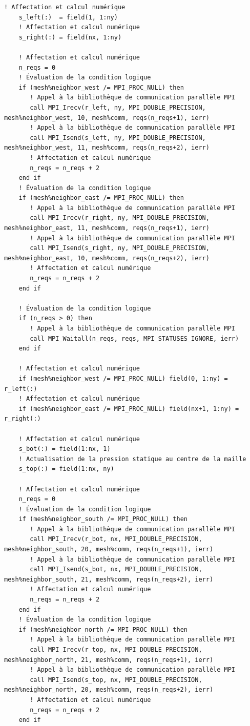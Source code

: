 \documentclass[10pt,a4paper,oneside]{book}
\begin{document}
\begin{lstlisting}[language={[95]Fortran}]
    ! Affectation et calcul numérique
    s_left(:)  = field(1, 1:ny)
    ! Affectation et calcul numérique
    s_right(:) = field(nx, 1:ny)

    ! Affectation et calcul numérique
    n_reqs = 0
    ! Évaluation de la condition logique
    if (mesh%neighbor_west /= MPI_PROC_NULL) then
       ! Appel à la bibliothèque de communication parallèle MPI
       call MPI_Irecv(r_left, ny, MPI_DOUBLE_PRECISION, mesh%neighbor_west, 10, mesh%comm, reqs(n_reqs+1), ierr)
       ! Appel à la bibliothèque de communication parallèle MPI
       call MPI_Isend(s_left, ny, MPI_DOUBLE_PRECISION, mesh%neighbor_west, 11, mesh%comm, reqs(n_reqs+2), ierr)
       ! Affectation et calcul numérique
       n_reqs = n_reqs + 2
    end if
    ! Évaluation de la condition logique
    if (mesh%neighbor_east /= MPI_PROC_NULL) then
       ! Appel à la bibliothèque de communication parallèle MPI
       call MPI_Irecv(r_right, ny, MPI_DOUBLE_PRECISION, mesh%neighbor_east, 11, mesh%comm, reqs(n_reqs+1), ierr)
       ! Appel à la bibliothèque de communication parallèle MPI
       call MPI_Isend(s_right, ny, MPI_DOUBLE_PRECISION, mesh%neighbor_east, 10, mesh%comm, reqs(n_reqs+2), ierr)
       ! Affectation et calcul numérique
       n_reqs = n_reqs + 2
    end if

    ! Évaluation de la condition logique
    if (n_reqs > 0) then
       ! Appel à la bibliothèque de communication parallèle MPI
       call MPI_Waitall(n_reqs, reqs, MPI_STATUSES_IGNORE, ierr)
    end if

    ! Affectation et calcul numérique
    if (mesh%neighbor_west /= MPI_PROC_NULL) field(0, 1:ny) = r_left(:)
    ! Affectation et calcul numérique
    if (mesh%neighbor_east /= MPI_PROC_NULL) field(nx+1, 1:ny) = r_right(:)

    ! Affectation et calcul numérique
    s_bot(:) = field(1:nx, 1)
    ! Actualisation de la pression statique au centre de la maille
    s_top(:) = field(1:nx, ny)

    ! Affectation et calcul numérique
    n_reqs = 0
    ! Évaluation de la condition logique
    if (mesh%neighbor_south /= MPI_PROC_NULL) then
       ! Appel à la bibliothèque de communication parallèle MPI
       call MPI_Irecv(r_bot, nx, MPI_DOUBLE_PRECISION, mesh%neighbor_south, 20, mesh%comm, reqs(n_reqs+1), ierr)
       ! Appel à la bibliothèque de communication parallèle MPI
       call MPI_Isend(s_bot, nx, MPI_DOUBLE_PRECISION, mesh%neighbor_south, 21, mesh%comm, reqs(n_reqs+2), ierr)
       ! Affectation et calcul numérique
       n_reqs = n_reqs + 2
    end if
    ! Évaluation de la condition logique
    if (mesh%neighbor_north /= MPI_PROC_NULL) then
       ! Appel à la bibliothèque de communication parallèle MPI
       call MPI_Irecv(r_top, nx, MPI_DOUBLE_PRECISION, mesh%neighbor_north, 21, mesh%comm, reqs(n_reqs+1), ierr)
       ! Appel à la bibliothèque de communication parallèle MPI
       call MPI_Isend(s_top, nx, MPI_DOUBLE_PRECISION, mesh%neighbor_north, 20, mesh%comm, reqs(n_reqs+2), ierr)
       ! Affectation et calcul numérique
       n_reqs = n_reqs + 2
    end if


\end{lstlisting}
\end{document}
